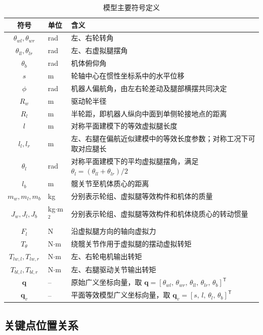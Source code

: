 \begin{table}[htbp]
  \centering
  \caption{模型主要符号定义}\label{tab:model-symbols}
  \renewcommand{\arraystretch}{1.25}
  \begin{tabular}{@{}clp{8.2cm}@{}}
    \toprule
    符号 & 单位 & 含义 \\
    \midrule
    $\theta_{wl}, \theta_{wr}$ & rad & 左、右轮转角 \\
    $\theta_{ll}, \theta_{lr}$ & rad & 左、右虚拟腿摆角 \\
    $\theta_b$ & rad & 机体俯仰角 \\
    $s$ & m & 轮轴中心在惯性坐标系中的水平位移 \\
    $\phi$ & rad & 机器人偏航角，由左右轮差动及腿部横摆共同决定 \\
    $R_w$ & m & 驱动轮半径 \\
    $R_l$ & m & 半轮距，即机器人纵向中面到单侧轮接地点的距离 \\
    $l$ & m & 对称平面建模下的等效虚拟腿长度 \\
    $l_l, l_r$ & m & 左、右腿在偏航近似建模中的等效长度参数；对称工况下可取对应腿长 \\
    $\theta_l$ & rad & 对称平面建模下的平均虚拟腿摆角，满足 $\theta_l=(\theta_{ll}+\theta_{lr})/2$ \\
    $l_b$ & m & 髋关节至机体质心的距离 \\
    $m_w, m_l, m_b$ & kg & 分别表示轮组、虚拟腿等效构件和机体的质量 \\
    $J_w, J_l, J_b$ & kg$\cdot$m$^2$ & 分别表示轮组、虚拟腿等效构件和机体绕质心的转动惯量 \\
    $F_l$ & N & 沿虚拟腿方向的轴向虚拟力 \\
    $T_\theta$ & N$\cdot$m & 绕髋关节作用于虚拟腿的摆动虚拟转矩 \\
    $T_{lw,l}, T_{lw,r}$ & N$\cdot$m & 左、右轮电机输出转矩 \\
    $T_{bl,l}, T_{bl,r}$ & N$\cdot$m & 左、右腿驱动关节输出转矩 \\
    $\boldsymbol{q}$ & -- & 原始广义坐标向量，取 $\boldsymbol{q} = [\theta_{wl},\, \theta_{wr},\, \theta_{ll},\, \theta_{lr},\, \theta_b]^\mathsf{T}$ \\
    $\boldsymbol{q}_v$ & -- & 平面等效模型广义坐标向量，取 $\boldsymbol{q}_v = [s,\, l,\, \theta_l,\, \theta_b]^\mathsf{T}$ \\
    \bottomrule
  \end{tabular}
\end{table}

\subsection{关键点位置关系}

